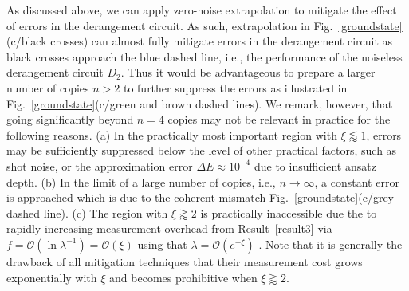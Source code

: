 \documentclass[aps,prx,showpacs,twocolumn,reprint]{revtex4-2}
\begin{document}
{As discussed above, we can apply zero-noise extrapolation to mitigate the effect of errors in the
derangement circuit. As such, extrapolation in Fig.~\ref{groundstate}(c/black crosses)
can almost fully mitigate errors in the derangement circuit as black crosses approach the blue
dashed line, i.e., the performance of the noiseless derangement circuit $D_2$.
Thus it would be advantageous to prepare a larger number of copies $n>2$ 
to further suppress the errors as illustrated in Fig.~\ref{groundstate}(c/green and brown dashed lines).
We remark, however, that going significantly beyond $n=4$ copies may not be relevant in practice for the following reasons.
(a)
In the practically most important region with $\xi \lessapprox 1$, errors may be sufficiently suppressed
below the level of other practical factors, such as shot noise, or the approximation error $\Delta E \approx 10^{-4}$ due to
insufficient ansatz depth.
(b)
In the limit of a large number of copies, i.e., $n \rightarrow \infty$, a constant error is approached
which is due to the coherent mismatch Fig.~\ref{groundstate}(c/grey dashed line).
(c)
The region with $\xi \gtrapprox 2$ is practically inaccessible due the to rapidly increasing measurement overhead
from Result~\ref{result3} via $f=\mathcal{O}(\ln\lambda^{-1}) = \mathcal{O}(\xi)$
using that $\lambda =\mathcal{O}( e^{-\xi} )$ \cite{koczor2021dominant}.
Note that it is generally the drawback of all mitigation techniques that their measurement cost
grows exponentially with $\xi$ and becomes prohibitive when $\xi \gtrapprox 2 $\cite{endo2020hybrid}.




}
\end{document}
